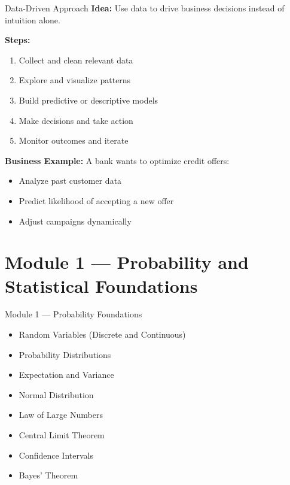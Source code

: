 \documentclass{beamer}
\begin{document}
\begin{frame}{Data-Driven Approach}
\textbf{Idea:} Use data to drive business decisions instead of intuition alone.

\vspace{0.5cm}

\textbf{Steps:}
\begin{enumerate}
    \item Collect and clean relevant data
    \item Explore and visualize patterns
    \item Build predictive or descriptive models
    \item Make decisions and take action
    \item Monitor outcomes and iterate
\end{enumerate}

\vspace{0.5cm}

\textbf{Business Example:}  
A bank wants to optimize credit offers:
\begin{itemize}
    \item Analyze past customer data
    \item Predict likelihood of accepting a new offer
    \item Adjust campaigns dynamically
\end{itemize}

\end{frame}


\section{Module 1 — Probability and Statistical Foundations}

\begin{frame}{Module 1 — Probability Foundations}
\begin{itemize}
    \item Random Variables (Discrete and Continuous)
    \item Probability Distributions
    \item Expectation and Variance
    \item Normal Distribution
    \item Law of Large Numbers
    \item Central Limit Theorem
    \item Confidence Intervals
    \item Bayes’ Theorem
\end{itemize}
\end{frame}
\end{document}
